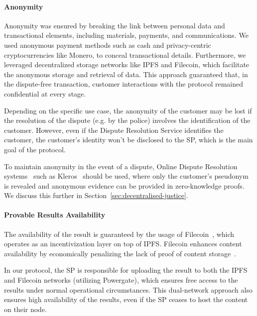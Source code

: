 \documentclass[pdftex,twocolumn,epjc3]{svjour3}
\begin{document}
\paragraph{Anonymity}
\begin{sloppypar}
Anonymity was ensured by breaking the link between personal data and transactional elements, including materials, payments, and communications. We used anonymous payment methods such as cash and privacy-centric cryptocurrencies like Monero, to conceal transactional details. Furthermore, we leveraged decentralized storage networks like IPFS and Filecoin, which facilitate the anonymous storage and retrieval of data. This approach guaranteed that, in the dispute-free transaction, customer interactions with the protocol remained confidential at every stage.

Depending on the specific use case, the anonymity of the customer may be lost if the resolution of the dispute (e.g. by the police) involves the identification of the customer. However, even if the Dispute Resolution Service identifies the customer, the customer's identity won't be disclosed to the SP, which is the main goal of the protocol.

To maintain anonymity in the event of a dispute,
Online Dispute Resolution systems~\cite{allenGovernanceBlockchainDispute2019, lingwallShouldCodeBe2019} such as  Kleros~\cite{bergollaKlerosSociolegalCase2022, nappertDecentralizedJusticeReinventing2020, gudkovCrowdArbitrationBlockchain2020} should be used, where only the customer's pseudonym is revealed and anonymous evidence can be provided in zero-knowledge proofs. We discuss this further in Section~\ref{sec:decentralised-justice}.
\end{sloppypar}

\paragraph{Provable Results Availability}\label{sec:provable-results-availability}
The availability of the result is guaranteed by the usage of Filecoin~\cite{protocollabsFilecoinDecentralizedStorage2017}, which operates as an incentivization layer on top of IPFS. Filecoin enhances content availability by economically penalizing the lack of proof of content storage~\cite{filecoinSlashing}.

In our protocol, the SP is responsible for uploading the result to both the IPFS and Filecoin networks (utilizing Powergate), which ensures free access to the results under normal operational circumstances. This dual-network approach also ensures high availability of the results, even if the SP ceases to host the content on their node.
\end{document}

